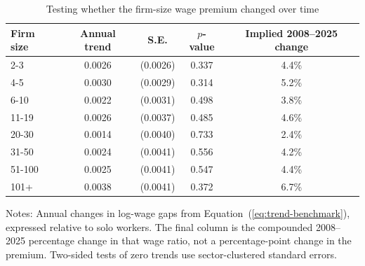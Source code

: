 \begin{table}[htbp]
  \centering
  \caption{Testing whether the firm-size wage premium changed over time}
  \label{tab:firm-size-premium-trend-test}
  \small
  \begin{tabular}{lcccc}
    \toprule
    Firm size & Annual trend & S.E. & $p$-value & Implied 2008--2025 change \\
    \midrule
    2-3 & 0.0026 & (0.0026) & 0.337 & 4.4\% \\
    4-5 & 0.0030 & (0.0029) & 0.314 & 5.2\% \\
    6-10 & 0.0022 & (0.0031) & 0.498 & 3.8\% \\
    11-19 & 0.0026 & (0.0037) & 0.485 & 4.6\% \\
    20-30 & 0.0014 & (0.0040) & 0.733 & 2.4\% \\
    31-50 & 0.0024 & (0.0041) & 0.556 & 4.2\% \\
    51-100 & 0.0025 & (0.0041) & 0.547 & 4.4\% \\
    101+ & 0.0038 & (0.0041) & 0.372 & 6.7\% \\
    \bottomrule
  \end{tabular}
  \vspace{0.3em}
  \begin{minipage}{0.95\textwidth}
  \footnotesize
  Notes: Annual changes in log-wage gaps from Equation~(\ref{eq:trend-benchmark}), expressed relative to solo workers. The final column is the compounded 2008--2025 percentage change in that wage ratio, not a percentage-point change in the premium. Two-sided tests of zero trends use sector-clustered standard errors.
  \end{minipage}
\end{table}
